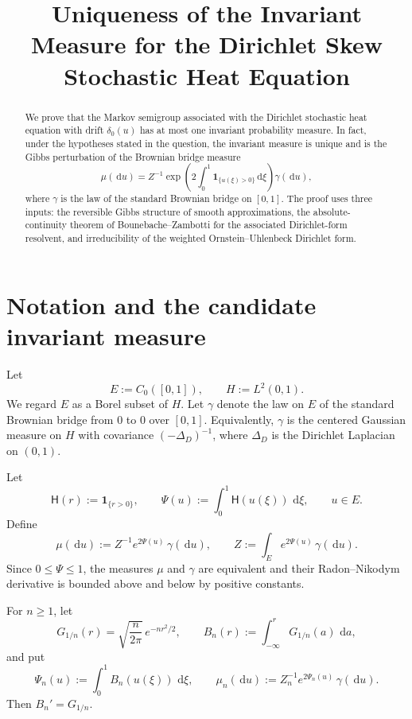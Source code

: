 \documentclass[11pt]{article}
\numberwithin{equation}{section}
\newcommand{\dd}{\,\mathrm d}
\newcommand{\1}{\mathbf 1}
\begin{document}
\title{Uniqueness of the Invariant Measure for the Dirichlet Skew Stochastic Heat Equation}
\author{}
\date{}
\maketitle

\begin{abstract}
We prove that the Markov semigroup associated with the Dirichlet stochastic heat
equation with drift $\delta_0(u)$ has at most one invariant probability measure.
In fact, under the hypotheses stated in the question, the invariant measure is unique
and is the Gibbs perturbation of the Brownian bridge measure
\[
        \mu(\dd u)=Z^{-1}\exp\!\left(2\int_0^1 \1_{\{u(\xi)>0\}}\dd \xi\right)\gamma(\dd u),
\]
where $\gamma$ is the law of the standard Brownian bridge on $[0,1]$.
The proof uses three inputs: the reversible Gibbs structure of smooth approximations,
the absolute-continuity theorem of Bounebache--Zambotti for the associated
Dirichlet-form resolvent, and irreducibility of the weighted Ornstein--Uhlenbeck
Dirichlet form.
\end{abstract}

\section{Notation and the candidate invariant measure}

Let
\[
        E:=C_0([0,1]),\qquad H:=L^2(0,1).
\]
We regard $E$ as a Borel subset of $H$. Let $\gamma$ denote the law on $E$ of the
standard Brownian bridge from $0$ to $0$ over $[0,1]$. Equivalently, $\gamma$ is the
centered Gaussian measure on $H$ with covariance $(-\Delta_D)^{-1}$, where
$\Delta_D$ is the Dirichlet Laplacian on $(0,1)$.

Let
\[
        \mathsf H(r):=\1_{\{r>0\}},\qquad
        \Psi(u):=\int_0^1 \mathsf H(u(\xi))\,\dd \xi,\qquad u\in E.
\]
Define
\begin{equation}\label{eq:mu-def}
        \mu(\dd u)
        := Z^{-1}e^{2\Psi(u)}\,\gamma(\dd u),
        \qquad
        Z:=\int_E e^{2\Psi(u)}\,\gamma(\dd u).
\end{equation}
Since $0\leq \Psi\leq 1$, the measures $\mu$ and $\gamma$ are equivalent and their
Radon--Nikodym derivative is bounded above and below by positive constants.

For $n\geq 1$, let
\[
        G_{1/n}(r)=\sqrt{\frac{n}{2\pi}}\,e^{-nr^2/2},\qquad
        B_n(r):=\int_{-\infty}^r G_{1/n}(a)\,\dd a,
\]
and put
\[
        \Psi_n(u):=\int_0^1 B_n(u(\xi))\,\dd \xi,\qquad
        \mu_n(\dd u):=Z_n^{-1}e^{2\Psi_n(u)}\,\gamma(\dd u).
\]
Then $B_n'=G_{1/n}$.
\end{document}
